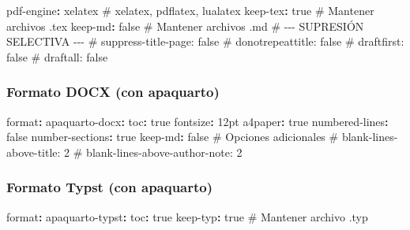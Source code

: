 \documentclass[
  doc,
  floatsintext,
  longtable,
  a4paper,
  nolmodern,
  notxfonts,
  notimes,
  12pt,
  colorlinks=true,linkcolor=blue,citecolor=blue,urlcolor=blue]{apa7}
\newenvironment{Shaded}{\begin{snugshade}}{\end{snugshade}}
\newcommand{\AttributeTok}[1]{\textcolor[rgb]{0.40,0.45,0.13}{#1}}
\newcommand{\CharTok}[1]{\textcolor[rgb]{0.13,0.47,0.30}{#1}}
\newcommand{\CommentTok}[1]{\textcolor[rgb]{0.37,0.37,0.37}{#1}}
\newcommand{\FunctionTok}[1]{\textcolor[rgb]{0.28,0.35,0.67}{#1}}
\newcommand{\KeywordTok}[1]{\textcolor[rgb]{0.00,0.23,0.31}{\textbf{#1}}}
\begin{document}
\begin{Shaded}
\begin{Highlighting}[]
\AttributeTok{    }\FunctionTok{pdf{-}engine}\KeywordTok{:}\AttributeTok{ xelatex}\CommentTok{                   \# xelatex, pdflatex, lualatex}
\AttributeTok{    }\FunctionTok{keep{-}tex}\KeywordTok{:}\AttributeTok{ }\CharTok{true}\CommentTok{                        \# Mantener archivos .tex}
\AttributeTok{    }\FunctionTok{keep{-}md}\KeywordTok{:}\AttributeTok{ }\CharTok{false}\CommentTok{                        \# Mantener archivos .md}
\AttributeTok{    }
\CommentTok{    \# {-}{-}{-} SUPRESIÓN SELECTIVA {-}{-}{-}}
\CommentTok{    \# suppress{-}title{-}page: false}
\CommentTok{    \# donotrepeattitle: false}
\CommentTok{    \# draftfirst: false}
\CommentTok{    \# draftall: false}
\end{Highlighting}
\end{Shaded}

\subsubsection{Formato DOCX (con
apaquarto)}\label{formato-docx-con-apaquarto}

\begin{Shaded}
\begin{Highlighting}[]
\FunctionTok{format}\KeywordTok{:}
\AttributeTok{  }\FunctionTok{apaquarto{-}docx}\KeywordTok{:}
\AttributeTok{    }\FunctionTok{toc}\KeywordTok{:}\AttributeTok{ }\CharTok{true}
\AttributeTok{    }\FunctionTok{fontsize}\KeywordTok{:}\AttributeTok{ 12pt}
\AttributeTok{    }\FunctionTok{a4paper}\KeywordTok{:}\AttributeTok{ }\CharTok{true}
\AttributeTok{    }\FunctionTok{numbered{-}lines}\KeywordTok{:}\AttributeTok{ }\CharTok{false}
\AttributeTok{    }\FunctionTok{number{-}sections}\KeywordTok{:}\AttributeTok{ }\CharTok{true}
\AttributeTok{    }\FunctionTok{keep{-}md}\KeywordTok{:}\AttributeTok{ }\CharTok{false}
\AttributeTok{    }
\CommentTok{    \# Opciones adicionales}
\CommentTok{    \# blank{-}lines{-}above{-}title: 2}
\CommentTok{    \# blank{-}lines{-}above{-}author{-}note: 2}
\end{Highlighting}
\end{Shaded}

\subsubsection{Formato Typst (con
apaquarto)}\label{formato-typst-con-apaquarto}

\begin{Shaded}
\begin{Highlighting}[]
\FunctionTok{format}\KeywordTok{:}
\AttributeTok{  }\FunctionTok{apaquarto{-}typst}\KeywordTok{:}
\AttributeTok{    }\FunctionTok{toc}\KeywordTok{:}\AttributeTok{ }\CharTok{true}
\AttributeTok{    }\FunctionTok{keep{-}typ}\KeywordTok{:}\AttributeTok{ }\CharTok{true}\CommentTok{                \# Mantener archivo .typ}
\end{Highlighting}
\end{Shaded}
\end{document}

